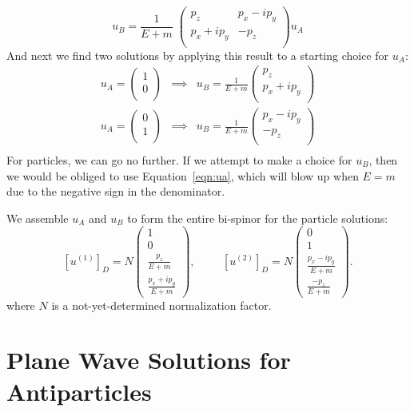 \documentclass[12pt]{article}
\begin{document}
$$u_B = \frac{1}{E+m} \; \begin{pmatrix} p_z & p_x - i p_y \\ p_x + i p_y & -p_z \\ \end{pmatrix} u_A
$$
And next we find two solutions by applying this result to a starting choice for $u_A$:
\begin{eqnarray*}
u_A = \begin{pmatrix} 1 \\ 0 \\ \end{pmatrix} &\implies&
u_B = \frac{1}{E+m} \begin{pmatrix} p_z \\ p_x + i p_y \\ \end{pmatrix}\\
u_A = \begin{pmatrix} 0 \\ 1 \\ \end{pmatrix} &\implies&
u_B = \frac{1}{E+m} \begin{pmatrix} p_x - i p_y \\ -p_z \\ \end{pmatrix}\\
\end{eqnarray*}
For particles, we can go no further.  If we attempt to make a choice for $u_B$, then we would be obliged to use Equation~\ref{eqn:ua}, which will blow up when $E=m$ due to the negative sign in the denominator.

We assemble $u_A$ and $u_B$ to form the entire bi-spinor for the particle solutions:
$$
[u^{(1)}]_D = N \begin{pmatrix} 1 \\ 0 \\ \frac{p_z}{E+m} \\[5pt] \frac{p_x + i p_y}{E + m} \end{pmatrix},
\hspace{1cm}
[u^{(2)}]_D = N \begin{pmatrix} 0 \\ 1 \\ \frac{p_x - i p_y}{E+m} \\ \frac{-p_z}{E+m} \end{pmatrix}.
$$
where $N$ is a not-yet-determined normalization factor. \\[5pt]


\section{Plane Wave Solutions for Antiparticles}
\end{document}
